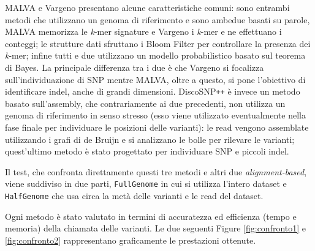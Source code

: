\documentclass[../main.tex]{subfiles}
\begin{document}
MALVA e Vargeno presentano alcune caratteristiche comuni: sono entrambi metodi che utilizzano un genoma di riferimento e sono ambedue basati su parole, MALVA memorizza le \textit{k}-mer signature e Vargeno i \textit{k}-mer e ne effettuano i conteggi; le strutture dati sfruttano i Bloom Filter per controllare la presenza dei \textit{k}-mer; infine tutti e due utilizzano un modello probabilistico basato sul teorema di Bayes. La principale differenza tra i due è che Vargeno si focalizza sull'individuazione di SNP mentre MALVA, oltre a questo, si pone l'obiettivo di identificare indel, anche di grandi dimensioni. DiscoSNP\texttt{++} è invece un metodo basato sull'assembly, che contrariamente ai due precedenti, non utilizza un genoma di riferimento in senso stresso (esso viene utilizzato eventualmente nella fase finale per individuare le posizioni delle varianti): le read vengono assemblate utilizzando i grafi di de Bruijn e si analizzano le bolle per rilevare le varianti; quest'ultimo metodo è stato progettato per individuare SNP e piccoli indel.

Il test, che confronta direttamente questi tre metodi e altri due \textit{alignment-based}, viene suddiviso in due parti, \texttt{FullGenome} in cui si utilizza l'intero dataset e \texttt{HalfGenome} che usa circa la metà delle varianti e le read del dataset.

Ogni metodo è stato valutato in termini di accuratezza ed efficienza (tempo e memoria) della chiamata delle varianti. Le due seguenti Figure \ref{fig:confronto1} e \ref{fig:confronto2} rappresentano graficamente le prestazioni ottenute.
\end{document}
